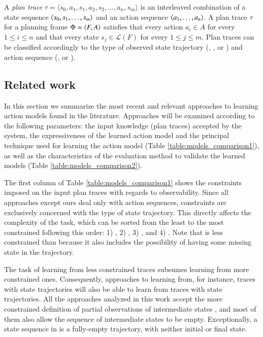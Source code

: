 A \emph{plan trace} $\tau = \langle s_0, a_1, s_1, a_2, s_2, \ldots, a_n, s_m \rangle$ is an interleaved combination of a state sequence ${\langle s_0, s_1, \ldots, s_m \rangle}$ and an action sequence ${\langle a_1, \ldots, a_n \rangle}$. A plan trace $\tau$ for a planning frame $\Phi={\langle F,A \rangle}$ satisfies that every action $a_i\in A$ for every {\small $1\leq i\leq n$} and that every state $s_j\in\mathcal{L}(F)$ for every {\small $1\leq j\leq m$}. Plan traces can be classified accordingly to the type of observed state trajectory (\FO, \POstar, \PO or \NO) and action sequence (\FO, \PO or \NO).




\subsection{Related work}
\label{related_work}

In this section we summarize the most recent and relevant approaches to learning action models found in the literature. Approaches will be examined according to the following parameters: the input knowledge (plan traces) accepted by the system, the expressiveness of the learned action model and the principal technique used for learning the action model (Table \ref{table:models_comparison1}), as well as the characteristics of the evaluation method to validate the learned models (Table \ref{table:models_comparison2}).

The first column of Table \ref{table:models_comparison1} shows the constraints imposed on the input plan traces with regards to observability. Since all approaches except ours deal only with \FO action sequences, constraints are exclusively concerned with the type of state trajectory. This directly affects the complexity of the task, which can be sorted from the least to the most constrained following this order: 1) \NO, 2) \PO, 3) \POstar, and 4) \FO. Note that \PO is less constrained than \POstar because it also includes the possibility of having some missing state in the trajectory.

The task of learning from less constrained traces subsumes learning from more constrained ones. Consequently, approaches to learning from, for instance, traces with \PO state trajectories will also be able to learn from traces with \POstar state trajectories. All the approaches analyzed in this work accept the more constrained definition of partial observations of intermediate states \POstar, and most of them also allow the sequence of intermediate states to be empty. Exceptionally, a \NO state sequence in \LOCM is a fully-empty trajectory, with neither initial or final state.


